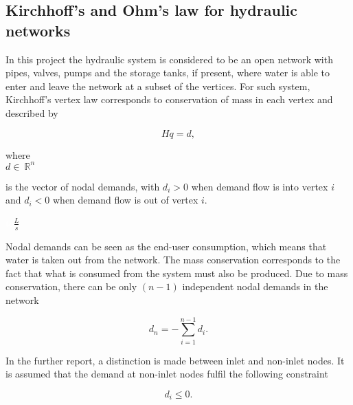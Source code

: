 \subsection{Kirchhoff's and Ohm's law for hydraulic networks}
\label{kirchhoffs_law}

In this project the hydraulic system is considered to be an open network with pipes, valves, pumps and the storage tanks, if present, where water is able to enter and leave the network at a subset of the vertices. For such system, Kirchhoff's vertex law corresponds to conservation of mass in each vertex and described by

\begin{equation}
  \label{vertexlaw_open}
  Hq = d,
\end{equation}

  \begin{minipage}[t]{0.20\textwidth}
where\\
\hspace*{8mm} $d \in \: \mathbb{R}^{n}$ 
\end{minipage}
\begin{minipage}[t]{0.68\textwidth}
\vspace*{2mm}
is the vector of nodal demands, with $d_i > 0$ when demand flow is into vertex $i$ and $d_i < 0$ when demand flow is out of vertex $i$.
\end{minipage}
\begin{minipage}[t]{0.10\textwidth}
\vspace*{2mm}
\textcolor{White}{te}$\unit{\frac{L}{s}}$
\end{minipage}

Nodal demands can be seen as the end-user consumption, which means that water is taken out from the network. The mass conservation corresponds to the fact that what is consumed from the system must also be produced. Due to mass conservation, there can be only $(n-1)$ independent nodal demands in the network

\begin{equation}
  \label{mass_conservation}
  d_n = - \sum_{i=1}^{n-1} d_i.
\end{equation}

In the further report, a distinction is made between inlet and non-inlet nodes. It is assumed that the demand at non-inlet nodes fulfil the following constraint

\begin{equation}
  \label{non_inlet_constraint}
  d_i \leq 0.
\end{equation}

